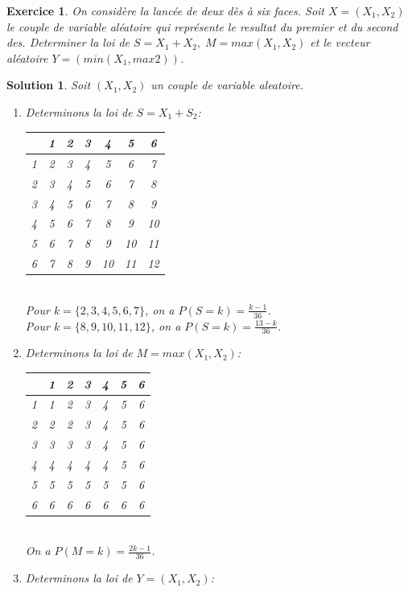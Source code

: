 \documentclass[a4paper, 12pt, french]{article}
\theoremstyle{break}
\newtheorem{exer}{Exercice}[section]
\newtheorem{sol}{Solution}[section]
\begin{document}
\begin{exer}
	On considère la lancée de deux dès à six faces. Soit $X = (X_{1}, X_{2})$ le couple de variable aléatoire qui représente le resultat du premier et du second des. Determiner la loi de $S = X_{1} + X_{2}, \; M = max(X_{1}, X_{2})$ et le vecteur aléatoire $Y = (min(X_{1}, max{2}))$.
\end{exer}

\begin{sol}
	Soit $(X_{1}, X_{2})$ un couple de variable aleatoire.
	\begin{enumerate}
		\item Determinons la loi de $S=X_{1} + S_{2}$:\\ 
		\begin{tabular}{|*7{c|}}
			\hline
				& 1 & 2 & 3 & 4 & 5 & 6 \\ \hline
			1	& 2 & 3 & 4 & 5 & 6 & 7 \\
			2	& 3 & 4 & 5 & 6 & 7 & 8 \\
			3	& 4 & 5 & 6 & 7 & 8 & 9 \\
			4	& 5 & 6 & 7 & 8 & 9 & 10 \\
			5	& 6 & 7 & 8 & 9 & 10 & 11 \\
			6	& 7 & 8 & 9 & 10 & 11 & 12 \\
			\hline
		\end{tabular}
		\\Pour $k = \{2,3,4,5,6,7\}$, on a $P(S=k) = \frac{k-1}{36}$.\\
		Pour $k = \{8,9,10,11,12\}$, on a $P(S=k) = \frac{13-k}{36}$.
		\item Determinons la loi de $M = max(X_{1}, X_{2})$:\\
		\begin{tabular}{|*7{c|}}
			\hline
				& 1 & 2 & 3 & 4 & 5 & 6 \\ \hline
			1	& 1 & 2 & 3 & 4 & 5 & 6 \\
			2	& 2 & 2 & 3 & 4 & 5 & 6 \\
			3	& 3 & 3 & 3 & 4 & 5 & 6 \\
			4	& 4 & 4 & 4 & 4 & 5 & 6 \\
			5	& 5 & 5 & 5 & 5 & 5 & 6 \\
			6	& 6 & 6 & 6 & 6 & 6 & 6 \\
			\hline
		\end{tabular}
		\\On a $P(M=k) = \frac{2k - 1}{36}$.
		\item Determinons la loi de $Y = (X_{1}, X_{2})$:\\
		\begin{tabular}{|*7{c|}}

\end{tabular}
\end{enumerate}
\end{sol}
\end{document}
